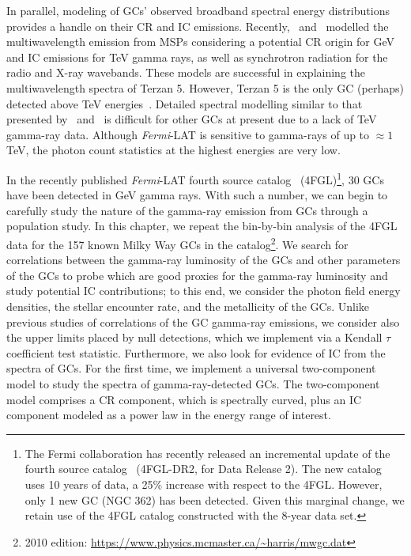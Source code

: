 \documentclass[doublespace,nopageskip]{VTthesis} %
\begin{document}
In parallel, modeling of GCs' observed broadband spectral energy distributions provides a handle on their CR and IC emissions. Recently,~\citet{2013ApJ...779..126K} and~\citet{2019ApJ...880...53N} modelled the multiwavelength emission from MSPs considering a potential CR origin for GeV and IC emissions for TeV gamma rays, as well as synchrotron radiation for the radio and X-ray wavebands. These models are successful in explaining the multiwavelength spectra of Terzan 5. However, Terzan 5 is the only GC (perhaps) detected above TeV energies~\citep{2011A&A...531L..18H}. Detailed spectral modelling similar to that presented by~\citet{2013ApJ...779..126K} and~\citet{2019ApJ...880...53N} is difficult for other GCs at present due to a lack of TeV gamma-ray data. Although \textit{Fermi}-LAT is sensitive to gamma-rays of up to $\approx 1$ TeV, the photon count statistics at the highest energies are very low.

In the recently published \textit{Fermi}-LAT fourth source catalog~\citep{2020ApJS..247...33A} (4FGL)\footnote{The Fermi collaboration has recently released an incremental update of the fourth source catalog~\citep{2020arXiv200511208B} (4FGL-DR2, for Data Release 2). The new catalog uses 10 years of data, a 25\% increase with respect to the 4FGL. However, only 1 new GC (NGC 362) has been detected. Given this marginal change, we retain use of the 4FGL catalog constructed with the 8-year data set.}, 30 GCs have been detected in GeV gamma rays. With such a number, we can begin to carefully study the nature of the gamma-ray emission from GCs through a population study. In this chapter, we repeat the bin-by-bin analysis of the 4FGL data for the 157 known Milky Way GCs in the \citet{1996AJ....112.1487H} catalog\footnote{2010  edition: \url{https://www.physics.mcmaster.ca/~harris/mwgc.dat}}. We search for correlations between the gamma-ray luminosity of the GCs and other parameters of the GCs to probe which are good proxies for the gamma-ray luminosity and study potential IC contributions; to this end, we consider the photon field energy densities, the stellar encounter rate, and the metallicity of the GCs. Unlike previous studies of correlations of the GC gamma-ray emissions, we consider also the upper limits placed by null detections, which we implement via a Kendall $\tau$ coefficient test statistic. Furthermore, we also look for evidence of IC from the spectra of GCs. For the first time, we implement a universal two-component model to study the spectra of gamma-ray-detected GCs. The two-component model comprises a CR component, which is spectrally curved, plus an IC component modeled as a power law in the energy range of interest.
\end{document}
